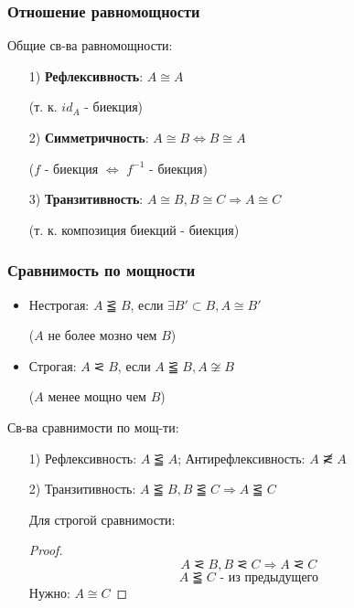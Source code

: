 \subsubsection{Отношение равномощности}

\begin{statement}
Общие св-ва равномощности:

\begin{enumerate}
  \item [1) ] \textbf{Рефлексивность}: $A \cong A$ 

    (т. к. $id_A$ - биекция)
  \item [2)] \textbf{Симметричность}: $A \cong B \iff B \cong A$ 
   
    ($f$ - биекция $\iff$ $f^{-1}$ - биекция)
  \item [3) ] \textbf{Транзитивность}: $A \cong B, B \cong C \Rightarrow A \cong C$ 

    (т. к. композиция биекций - биекция)
\end{enumerate}
\end{statement}

\subsubsection{Сравнимость по мощности}
\begin{symb}
  \begin{itemize}
    \item
Нестрогая: $A \simlE B$, если $\exists B' \subset B, A \cong B'$ 

($A$ не более мозно чем $B$) 
\item  Строгая: $A \simless B$, если $A \simlE B, A \not\cong B$

  ($A$ менее мощно чем $B$)
  \end{itemize}
\end{symb}
\begin{statement}
Св-ва сравнимости по мощ-ти:
\begin{itemize}
  \item [1) ] Рефлексивность: $A \simlE A$; Антирефлексивность: $A \not\simless A$
  \item [2) ] Транзитивность: $A \simlE B, B \simlE C \Rightarrow A \simlE C$

    Для строгой сравнимости:
    \begin{proof}
    \[
    A \simless B, B \simless C \Rightarrow A \simless C
    \] 
    \[
    A \simlE C \text{ - из предыдущего}
    \]
    Нужно: $A \cong C$
    \end{proof}
\end{itemize}
\end{statement}

